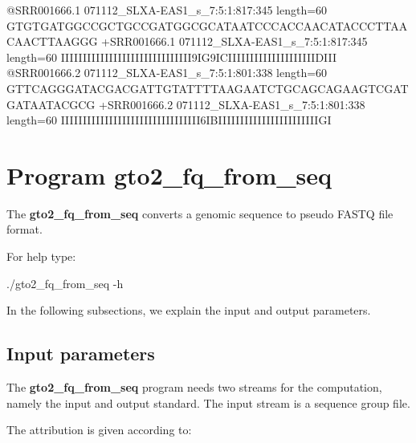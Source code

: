 \documentclass[11pt,]{krantz}
\newenvironment{Shaded}{\begin{snugshade}}{\end{snugshade}}
\newcommand{\ExtensionTok}[1]{#1}
\newcommand{\NormalTok}[1]{#1}
\begin{document}
\begin{Shaded}
\begin{Highlighting}[]
\ExtensionTok{@SRR001666.1}\NormalTok{ 071112_SLXA-EAS1_s_7:5:1:817:345 length=60}
\ExtensionTok{GTGTGATGGCCGCTGCCGATGGCGCATAATCCCACCAACATACCCTTAACAACTTAAGGG}
\ExtensionTok{+SRR001666.1}\NormalTok{ 071112_SLXA-EAS1_s_7:5:1:817:345 length=60}
\ExtensionTok{IIIIIIIIIIIIIIIIIIIIIIIIIIIIII9IG9ICIIIIIIIIIIIIIIIIIIIIDIII}
\ExtensionTok{@SRR001666.2}\NormalTok{ 071112_SLXA-EAS1_s_7:5:1:801:338 length=60}
\ExtensionTok{GTTCAGGGATACGACGATTGTATTTTAAGAATCTGCAGCAGAAGTCGATGATAATACGCG}
\ExtensionTok{+SRR001666.2}\NormalTok{ 071112_SLXA-EAS1_s_7:5:1:801:338 length=60}
\ExtensionTok{IIIIIIIIIIIIIIIIIIIIIIIIIIIIIIII6IBIIIIIIIIIIIIIIIIIIIIIIIGI}
\end{Highlighting}
\end{Shaded}

\section{Program gto2\_fq\_from\_seq}\label{program-gto2_fq_from_seq}

The \textbf{gto2\_fq\_from\_seq} converts a genomic sequence to pseudo
FASTQ file format.

For help type:

\begin{Shaded}
\begin{Highlighting}[]
\ExtensionTok{./gto2_fq_from_seq}\NormalTok{ -h}
\end{Highlighting}
\end{Shaded}

In the following subsections, we explain the input and output
parameters.

\subsection*{Input parameters}\label{input-parameters-9}


The \textbf{gto2\_fq\_from\_seq} program needs two streams for the
computation, namely the input and output standard. The input stream is a
sequence group file.

The attribution is given according to:
\end{document}
